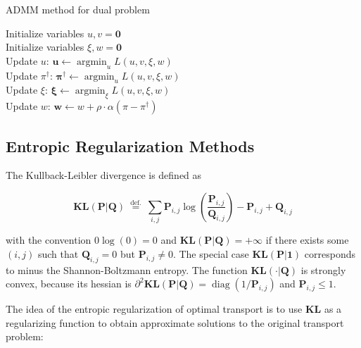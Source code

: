 \vspace{2ex}
    \begin{algorithm}[htbp]
        \SetAlgoNoLine
        \caption{ADMM method for dual problem} 
        Initialize variables $u, v = \boldsymbol{0}$\\
        Initialize variables $\xi, w = \boldsymbol{0}$\\
        {  
            Update $u$: $\boldsymbol{u} \leftarrow \operatorname{argmin}_{u} L(u, v, \xi, w)$\\
            Update $\pi^{\dagger}$: $\boldsymbol{\pi}^{\dagger} \leftarrow \operatorname{argmin}_{u} L(u, v, \xi, w)$\\
            Update $\xi$: $\boldsymbol{\xi} \leftarrow \operatorname{argmin}_{\xi} L(u, v, \xi, w)$\\
            Update $w$: $\boldsymbol{w} \leftarrow w + \rho\cdot \alpha (\pi - \pi^{\dagger})$\\
        }
    \end{algorithm}

\subsection{Entropic Regularization Methods}
The Kullback-Leibler divergence is defined as 

\begin{equation}
  \mathbf{K L}(\mathbf{P} | \mathbf{Q}) \stackrel{\text { def. }}{=} \sum_{i, j} \mathbf{P}_{i, j} \log \left(\frac{\mathbf{P}_{i, j}}{\mathbf{Q}_{i, j}}\right)-\mathbf{P}_{i, j}+\mathbf{Q}_{i, j}
\end{equation}

with the convention $0 \log(0) = 0$ and $\mathbf{K L}(\mathbf{P} | \mathbf{Q}) = +\infty$ if there exists some $(i, j)$ such that $\mathbf{Q}_{i,j} = 0$ but $\mathbf{P}_{i,j} \neq 0$. The special case $\mathbf{K L}(\mathbf{P} | \mathbf{1})$ corresponds to minus the Shannon-Boltzmann entropy. The function $\mathbf{K L}(\cdot | \mathbf{Q})$ is strongly convex, because its hessian is $\partial^{2} \mathbf{K L}(\mathbf{P} | \mathbf{Q})=\operatorname{diag}\left(1 / \mathbf{P}_{i, j}\right)$ and $\mathbf{P}_{i,j} \leq 1$.

The idea of the entropic regularization of optimal transport is to use $\mathbf{KL}$ as a regularizing function to obtain approximate solutions to the original transport problem:

